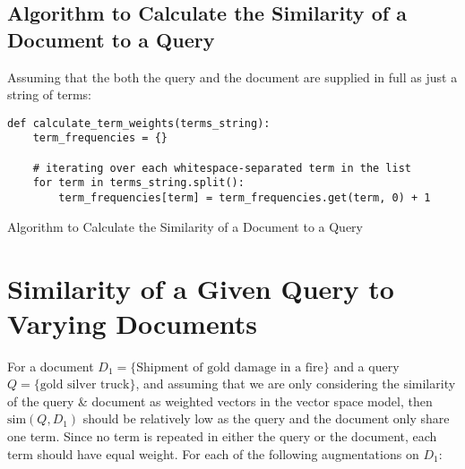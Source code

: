 \documentclass[a4paper]{article}
\newenvironment{code}{\captionsetup{type=listing}}{}
\begin{document}
\subsection{Algorithm to Calculate the Similarity of a Document to a Query}
Assuming that the both the query and the document are supplied in full as just a string of terms:
\begin{code}
\begin{verbatim}
def calculate_term_weights(terms_string):
    term_frequencies = {}

    # iterating over each whitespace-separated term in the list
    for term in terms_string.split():
        term_frequencies[term] = term_frequencies.get(term, 0) + 1

\end{verbatim}
\caption{Algorithm to Calculate the Similarity of a Document to a Query}
\end{code}

\section{Similarity of a Given Query to Varying Documents}
For a document $D_1 = \{ \text{Shipment of gold damage in a fire} \}$ and a query $Q = \{ \text{gold silver truck} \}$,
and assuming that we are only considering the similarity of the query \& document as weighted vectors in the vector space model, then $\text{sim}(Q, D_1)$ should be relatively low as the query and the document only share one term.
Since no term is repeated in either the query or the document, each term should have equal weight.
For each of the following augmentations on $D_1$:
\end{document}
